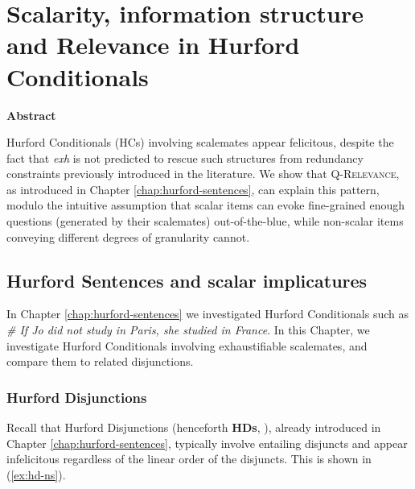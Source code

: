 \sloppy
	

\chapter{Scalarity, information structure and Relevance in Hurford Conditionals}\label{chap:scalarity}

\begin{center}
	\textbf{Abstract}
\end{center}

\begin{small}
	Hurford Conditionals (HCs) involving scalemates appear felicitous, despite the fact that \textit{exh} is not predicted to rescue such structures from redundancy constraints previously introduced in the literature. We show that \textsc{Q-Relevance}, as introduced in Chapter \ref{chap:hurford-sentences}, can explain this pattern, modulo the intuitive assumption that scalar items can evoke fine-grained enough questions (generated by their scalemates) out-of-the-blue, while non-scalar items conveying different degrees of granularity cannot.
\end{small}
	\section{Hurford Sentences and scalar implicatures}
	In Chapter \ref{chap:hurford-sentences} we investigated Hurford Conditionals such as \textit{\# If Jo did not study in Paris, she studied in France}. In this Chapter, we investigate Hurford Conditionals involving exhaustifiable scalemates, and compare them to related disjunctions.
	\subsection{Hurford Disjunctions}
	
	
	Recall that Hurford Disjunctions (henceforth \textbf{HDs}, \cite{Hurford1974}), already introduced in Chapter \ref{chap:hurford-sentences}, typically involve entailing disjuncts and appear infelicitous regardless of the linear order of the disjuncts. This is shown in (\ref{ex:hd-ns}).
	
	\begin{exe}
		\ex\label{ex:hd-ns}
		\begin{xlist}
			\label{ex:hd-w-s}
			\label{ex:hd-s-w}
		\end{xlist}
	\end{exe}
	
